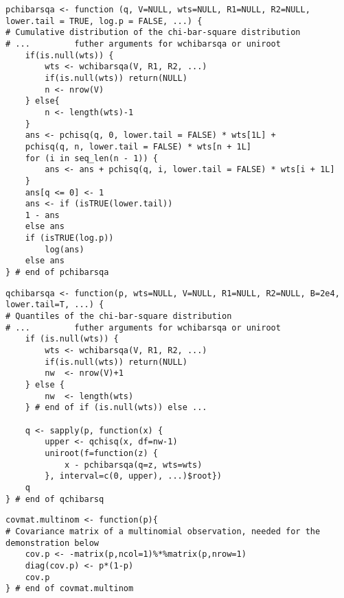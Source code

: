 \documentclass[times,doublespace]{simauth_amod}
\begin{document}
\begin{lstlisting}
pchibarsqa <- function (q, V=NULL, wts=NULL, R1=NULL, R2=NULL, lower.tail = TRUE, log.p = FALSE, ...) {
# Cumulative distribution of the chi-bar-square distribution
# ...         futher arguments for wchibarsqa or uniroot
	if(is.null(wts)) {
		wts <- wchibarsqa(V, R1, R2, ...)
		if(is.null(wts)) return(NULL)
		n <- nrow(V)
	} else{
		n <- length(wts)-1
	}
	ans <- pchisq(q, 0, lower.tail = FALSE) * wts[1L] + 
	pchisq(q, n, lower.tail = FALSE) * wts[n + 1L]
	for (i in seq_len(n - 1)) {
		ans <- ans + pchisq(q, i, lower.tail = FALSE) * wts[i + 1L]
	}
	ans[q <= 0] <- 1
	ans <- if (isTRUE(lower.tail)) 
	1 - ans
	else ans
	if (isTRUE(log.p)) 
		log(ans)
	else ans
} # end of pchibarsqa
\end{lstlisting}

\begin{lstlisting}
qchibarsqa <- function(p, wts=NULL, V=NULL, R1=NULL, R2=NULL, B=2e4, lower.tail=T, ...) {
# Quantiles of the chi-bar-square distribution
# ...         futher arguments for wchibarsqa or uniroot
	if (is.null(wts)) {
		wts <- wchibarsqa(V, R1, R2, ...)
		if(is.null(wts)) return(NULL)
		nw  <- nrow(V)+1
	} else {
		nw  <- length(wts)
	} # end of if (is.null(wts)) else ...
	
	q <- sapply(p, function(x) {
		upper <- qchisq(x, df=nw-1)
		uniroot(f=function(z) {
			x - pchibarsqa(q=z, wts=wts)
		}, interval=c(0, upper), ...)$root})
	q
} # end of qchibarsq
\end{lstlisting}

\begin{lstlisting}
covmat.multinom <- function(p){ 
# Covariance matrix of a multinomial observation, needed for the demonstration below
	cov.p <- -matrix(p,ncol=1)%*%matrix(p,nrow=1) 
	diag(cov.p) <- p*(1-p)
	cov.p
} # end of covmat.multinom
\end{lstlisting}
\clearpage
\end{document}
